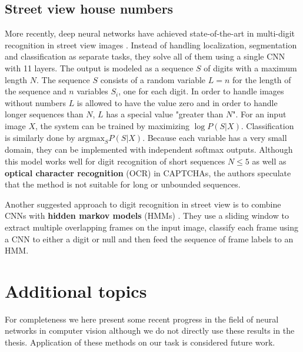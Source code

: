 \subsection{Street view house numbers}


More recently, deep neural networks have achieved state-of-the-art in multi-digit recognition in street view images \cite{multidigit_streetview}. Instead of handling localization, segmentation and classification as separate tasks, they solve all of them using a single CNN with 11 layers. The output is modeled as a sequence $S$ of digits with a maximum length $N$. The sequence $S$ consists of a random variable $L=n$ for the length of the sequence and $n$ variables $S_i$, one for each digit. In order to handle images without numbers $L$ is allowed to have the value zero and in order to handle longer sequences than $N$, $L$ has a special value "greater than $N$". For an input image $X$, the system can be trained by maximizing $\log P(S \vert X)$. Classification is similarly done by $\text{argmax}_S P(S \vert X)$.
Because each variable has a very small domain, they can be implemented with independent softmax outputs.
Although this model works well for digit recognition of short sequences $N \leq 5$ as well as \textbf{optical character recognition} (OCR) in CAPTCHAs, the authors speculate that the method is not suitable for long or unbounded sequences.

Another suggested approach to digit recognition in street view is to combine CNNs with \textbf{hidden markov models} (HMMs) \cite{multidigit_streetview_CNN_HMM}. They use a sliding window to extract multiple overlapping frames on the input image, classify each frame using a CNN to either a digit or null and then feed the sequence of frame labels to an HMM.


\section{Additional topics}

For completeness we here present some recent progress in the field of neural networks in computer vision although we do not directly use these results in the thesis. Application of these methods on our task is considered future work.




